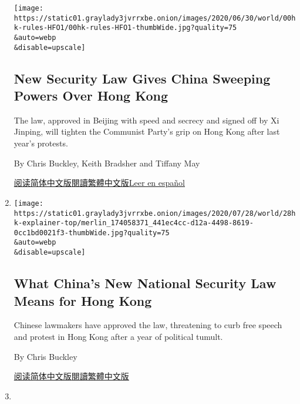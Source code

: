 \begin{enumerate}
  \texttt{[image: https://static01.graylady3jvrrxbe.onion/images/2020/06/30/world/00hk-rules-HFO1/00hk-rules-HFO1-thumbWide.jpg?quality=75\\\&auto=webp\\\&disable=upscale]}

  \hypertarget{new-security-law-gives-china-sweeping-powers-over-hong-kong}{%
  \subsection{New Security Law Gives China Sweeping Powers Over Hong
  Kong}\label{new-security-law-gives-china-sweeping-powers-over-hong-kong}}

  The law, approved in Beijing with speed and secrecy and signed off by
  Xi Jinping, will tighten the Communist Party's grip on Hong Kong after
  last year's protests.

  By Chris Buckley, Keith Bradsher and Tiffany May

  \href{https://cn.nytimes3xbfgragh.onion/china/20200630/china-hong-kong-security-law-rules/}{阅读简体中文版}\href{https://cn.nytimes3xbfgragh.onion/china/20200630/china-hong-kong-security-law-rules/}{閱讀繁體中文版}\href{https://www.nytimes3xbfgragh.onion/es/2020/06/30/espanol/mundo/hong-kong-china-leyes-seguridad.html}{Leer
  en español}
\item
  \href{/2020/06/28/world/asia/china-hong-kong-national-security-law.html}{}

  \texttt{[image: https://static01.graylady3jvrrxbe.onion/images/2020/07/28/world/28hk-explainer-top/merlin\_174058371\_441ec4cc-d12a-4498-8619-0cc1bd0021f3-thumbWide.jpg?quality=75\\\&auto=webp\\\&disable=upscale]}

  \hypertarget{what-chinas-new-national-security-law-means-for-hong-kong}{%
  \subsection{What China's New National Security Law Means for Hong
  Kong}\label{what-chinas-new-national-security-law-means-for-hong-kong}}

  Chinese lawmakers have approved the law, threatening to curb free
  speech and protest in Hong Kong after a year of political tumult.

  By Chris Buckley

  \href{https://cn.nytimes3xbfgragh.onion/china/20200629/china-hong-kong-national-security-law/}{阅读简体中文版}\href{https://cn.nytimes3xbfgragh.onion/china/20200629/china-hong-kong-national-security-law/zh-hant/}{閱讀繁體中文版}
\item
  \href{/2020/06/20/world/asia/china-hong-kong-security-law.html}{}


\end{enumerate}
